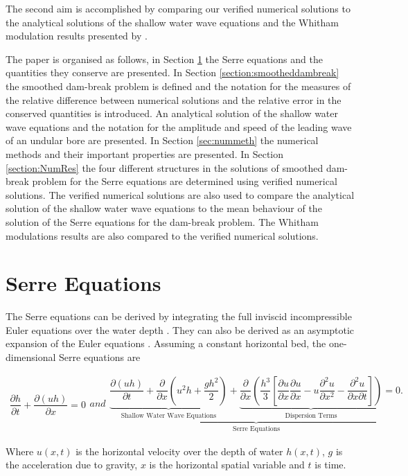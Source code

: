 \documentclass[times]{elsarticle}
\begin{document}
The second aim is accomplished by comparing our verified numerical solutions to the analytical solutions of the shallow water wave equations and the Whitham modulation results presented by \citet{El-etal-2006}. 
 
The paper is organised as follows, in Section \ref{section:Serre Equations} the Serre equations and the quantities they conserve are presented. In Section \ref{section:smootheddambreak} the smoothed dam-break problem is defined and the notation for the measures of the relative difference between numerical solutions and the relative error in the conserved quantities is introduced. An analytical solution of the shallow water wave equations and the notation for the amplitude and speed of the leading wave of an undular bore are presented. In Section \ref{sec:nummeth} the numerical methods and their important properties are presented. In Section \ref{section:NumRes} the four different structures in the solutions of smoothed dam-break problem for the Serre equations are determined using verified numerical solutions. The verified numerical solutions are also used to compare the analytical solution of the shallow water wave equations to the mean behaviour of the solution of the Serre equations for the dam-break problem. The Whitham modulations results are also compared to the verified numerical solutions.

\section{Serre Equations}
\label{section:Serre Equations}
The Serre equations can be derived by integrating the full inviscid incompressible Euler equations over the water depth \cite{Su-Gardener-1969-536}. They can also be derived as an asymptotic expansion of the Euler equations \cite{Bonneton-Lannes-2009-16601}. Assuming a constant horizontal bed, the one-dimensional Serre equations are \cite{Guyenne-etal-2014-169}
\begin{linenomath*}
\begin{subequations}\label{eq:Serre_nonconservative_form}
\begin{gather}
\dfrac{\partial h}{\partial t} + \dfrac{\partial (uh)}{\partial x} = 0
\label{eq:Serre_continuity}
\end{gather}
and
\begin{gather}
\underbrace{\underbrace{\dfrac{\partial (uh)}{\partial t} + \dfrac{\partial}{\partial x} \left ( u^2h + \dfrac{gh^2}{2}\right )}_{\text{Shallow Water Wave Equations}} + \underbrace{\dfrac{\partial}{\partial x} \left (  \dfrac{h^3}{3} \left [ \dfrac{\partial u }{\partial x} \dfrac{\partial u}{\partial x} - u\dfrac{\partial^2 u}{\partial x^2}  - \dfrac{\partial^2 u}{\partial x \partial t}\right ] \right )}_{\text{Dispersion Terms}} = 0.}_{\text{Serre Equations}}
\label{eq:Serre_momentum}
\end{gather}
\end{subequations}
\end{linenomath*}
Where $u(x,t)$ is the horizontal velocity over the depth of water $h(x,t)$, $g$ is the acceleration due to gravity, $x$ is the horizontal spatial variable and $t$ is time. 
\end{document}
